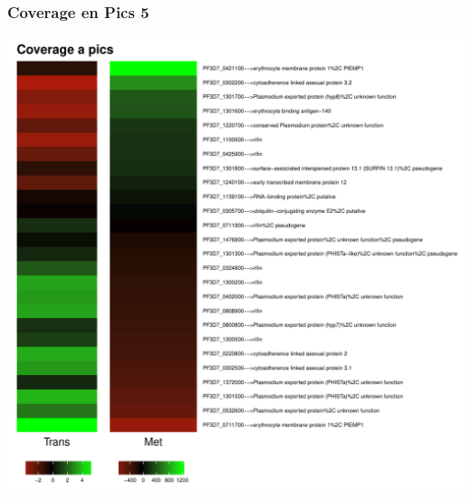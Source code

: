 \documentclass{article}\usepackage[]{graphicx}\usepackage[]{color}
\newenvironment{knitrout}{}{} %
\begin{document}
\subsubsection{Coverage en Pics 5}
\begin{knitrout}
\color{fgcolor}

{\centering \includegraphics[width=.9\linewidth]{figure/minimal-met_covapics_5-1} 

}



\end{knitrout}
\clearpage
\end{document}
